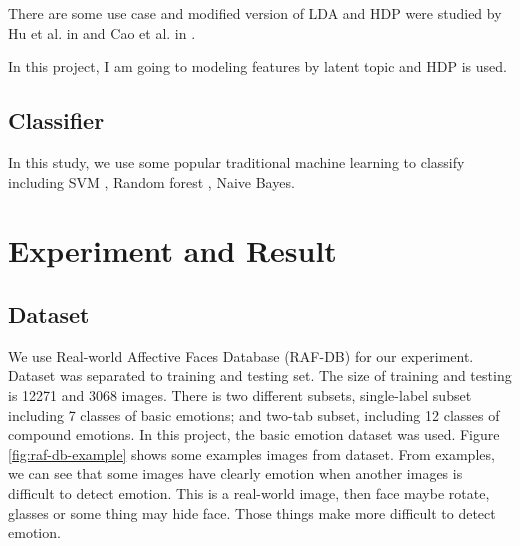 \documentclass[12pt]{article}
\begin{document}
There are some use case and modified version of LDA and HDP were studied by Hu et al. in \cite{Hu2009} and Cao et al. in \cite{Cao2007}.

In this project, I am going to modeling features by latent topic and HDP is used.

\subsection{Classifier}
In this study, we use some popular traditional machine learning to classify including SVM \cite{suykens1999least}, Random forest \cite{liaw2002classification}, Naive Bayes.


\section{Experiment and Result}
\subsection{Dataset}

We use Real-world Affective Faces Database \cite{li2017reliable, li2019reliable} (RAF-DB) for our experiment.
Dataset was separated to training and testing set.
The size of training and testing is 12271 and 3068 images.
There is two different subsets, single-label subset including 7 classes of basic emotions; and two-tab subset, including 12 classes of compound emotions.
In this project, the basic emotion dataset was used.
Figure \ref{fig:raf-db-example} shows some examples images from dataset.
From examples, we can see that some images have clearly emotion when another images is difficult to detect emotion.
This is a real-world image, then face maybe rotate, glasses or some thing may hide face.
Those things make more difficult to detect emotion.
\end{document}
